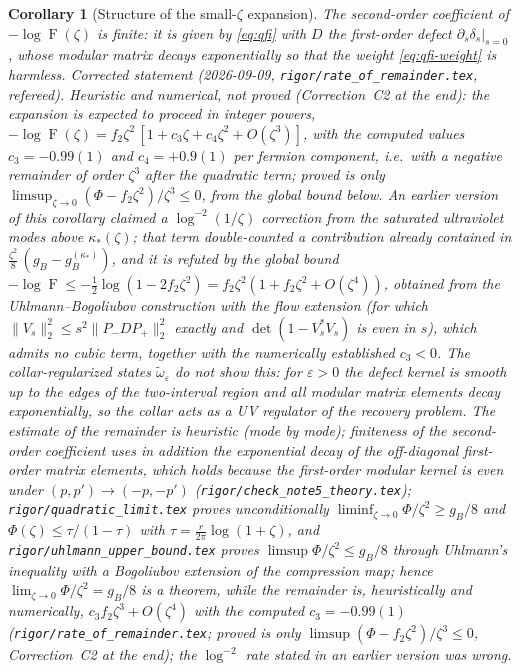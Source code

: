 \documentclass[11pt]{article}
\theoremstyle{accent}
\newtheorem{corollary}[theorem]{Corollary}
\theoremstyle{definition}
\newcommand{\eps}{\varepsilon}
\newcommand{\Fid}{\operatorname{F}}
\begin{document}
\begin{corollary}[Structure of the small-\(\zeta\) expansion]\label{cor:structure}
The second-order coefficient of \(-\log\Fid(\zeta)\) is finite: it is given by \eqref{eq:qfi} with \(D\) the first-order defect \(\partial_s\delta_s|_{s=0}\), whose modular matrix decays exponentially so that the weight \eqref{eq:qfi-weight} is harmless.  \emph{Corrected statement (2026-09-09, \texttt{rigor/rate\_of\_remainder.tex}, refereed).}  Heuristic and numerical, not proved (Correction~C2 at the end): the expansion is expected to proceed in integer powers, \(-\log\Fid(\zeta)=f_2\zeta^2\,[1+c_3\zeta+c_4\zeta^2+O(\zeta^3)]\), with the computed values \(c_3=-0.99(1)\) and \(c_4=+0.9(1)\) per fermion component, i.e.\ with a negative remainder of order \(\zeta^3\) after the quadratic term; proved is only \(\limsup_{\zeta\to0}(\Phi-f_2\zeta^2)/\zeta^3\le0\), from the global bound below.  An earlier version of this corollary claimed a \(\log^{-2}(1/\zeta)\) correction from the saturated ultraviolet modes above \(\kappa_*(\zeta)\); that term double-counted a contribution already contained in \(\frac{\zeta^2}8\,(g_B-g_B^{(\kappa_*)})\), and it is refuted by the global bound \(-\log\Fid\le-\frac12\log(1-2f_2\zeta^2)=f_2\zeta^2(1+f_2\zeta^2+O(\zeta^4))\), obtained from the Uhlmann--Bogoliubov construction with the flow extension (for which \(\|V_s\|_2^2\le s^2\|P_-DP_+\|_2^2\) exactly and \(\det(1-V_s^*V_s)\) is even in \(s\)), which admits no cubic term, together with the numerically established \(c_3<0\).  The collar-regularized states \(\widetilde\omega_{\eps}\) do not show this: for \(\eps>0\) the defect kernel is smooth up to the edges of the two-interval region and all modular matrix elements decay exponentially, so the collar acts as a UV regulator of the recovery problem.
  The estimate of the remainder is heuristic (mode by mode); finiteness of the second-order coefficient uses in addition the exponential decay of the off-diagonal first-order matrix elements, which holds because the first-order modular kernel is even under \((p,p')\to(-p,-p')\) (\texttt{rigor/check\_note5\_theory.tex}); \texttt{rigor/quadratic\_limit.tex} proves unconditionally \(\liminf_{\zeta\to0}\Phi/\zeta^2\ge g_B/8\) and \(\Phi(\zeta)\le\tau/(1-\tau)\) with \(\tau=\frac r{2\pi}\log(1+\zeta)\), and \texttt{rigor/uhlmann\_upper\_bound.tex} proves \(\limsup\Phi/\zeta^2\le g_B/8\) through Uhlmann's inequality with a Bogoliubov extension of the compression map; hence \(\lim_{\zeta\to0}\Phi/\zeta^2=g_B/8\) is a theorem, while the remainder is, heuristically and numerically, \(c_3f_2\zeta^3+O(\zeta^4)\) with the computed \(c_3=-0.99(1)\) (\texttt{rigor/rate\_of\_remainder.tex}; proved is only \(\limsup(\Phi-f_2\zeta^2)/\zeta^3\le0\), Correction~C2 at the end); the \(\log^{-2}\) rate stated in an earlier version was wrong.
\end{corollary}
\end{document}
